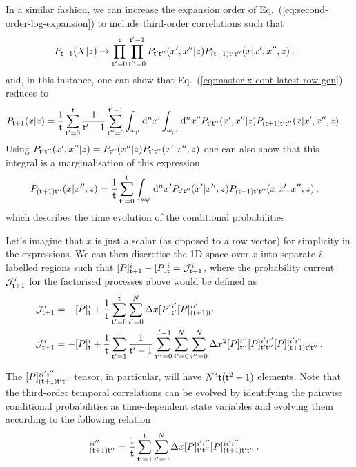 In a similar fashion, we can increase the expansion order of Eq.~(\ref{eq:second-order-log-expansion}) to include third-order correlations such that 
\begin{align}
P_{{\sf t}+1}(X\vert z) &\rightarrow \prod_{{\sf t}'=0}^{{\sf t}}\prod_{{\sf t}''=0}^{{\sf t}'-1} P_{{\sf t}'{\sf t}''}(x',x''\vert z)P_{({\sf t}+1){\sf t}'{\sf t}''}(x\vert x',x'',z) \,,
\end{align}
and, in this instance, one can show that Eq.~(\ref{eq:master-x-cont-latest-row-gen}) reduces to
\begin{align}
P_{{\sf t}+1}(x\vert z) &= \frac{1}{{\sf t}}\sum_{{\sf t}'=0}^{{\sf t}}\frac{1}{{\sf t}'-1}\sum_{{\sf t}''=0}^{{\sf t}'-1}\int_{\omega_{{\sf t}'}}{\rm d}^nx'\int_{\omega_{{\sf t}''}}{\rm d}^nx'' P_{{\sf t}'{\sf t}''}(x',x''\vert z)P_{({\sf t}+1){\sf t}'{\sf t}''}(x\vert x',x'',z) \label{eq:third-order-correl} \,.
\end{align}
Using $P_{{\sf t}'{\sf t}''}(x',x''\vert z) = P_{{\sf t}''}(x''\vert z) P_{{\sf t}'{\sf t}''}(x'\vert x'', z)$ one can also show that this integral is a marginalisation of this expression
\begin{align}
P_{({\sf t}+1){\sf t}''}(x\vert x'', z) &= \frac{1}{{\sf t}}\sum_{{\sf t}'=0}^{{\sf t}}\int_{\omega_{{\sf t}'}}{\rm d}^nx'P_{{\sf t}'{\sf t}''}(x'\vert x'',z)P_{({\sf t}+1){\sf t}'{\sf t}''}(x\vert x',x'',z) \,,
\end{align}
which describes the time evolution of the conditional probabilities.

Let's imagine that $x$ is just a scalar (as opposed to a row vector) for simplicity in the expressions. We can then discretise the 1D space over $x$ into separate $i$-labelled regions such that $[P]^i_{{\sf t}+1} - [P]^i_{{\sf t}} = {\cal J}^i_{{\sf t}+1}$, where the probability current ${\cal J}^i_{{\sf t}+1}$ for the factorised processes above would be defined as
\begin{align}
{\cal J}^i_{{\sf t}+1} &= - [P]^i_{{\sf t}} + \frac{1}{{\sf t}}\sum^{{\sf t}}_{{\sf t}'=0}\sum_{i'=0}^N\Delta x[P]^{i'}_{{\sf t}'}[P]^{ii'}_{({\sf t}+1){\sf t}'} \\
{\cal J}^i_{{\sf t}+1} &= - [P]^i_{{\sf t}} + \frac{1}{{\sf t}}\sum^{{\sf t}}_{{\sf t}'=1}\frac{1}{{\sf t}'-1}\sum^{{\sf t}'-1}_{{\sf t}''=0}\sum_{i'=0}^N\sum_{i''=0}^N\Delta x^2[P]^{i''}_{{\sf t}''}[P]^{i'i''}_{{\sf t}'{\sf t}''}[P]^{ii'i''}_{({\sf t}+1){\sf t}'{\sf t}''}\,.
\end{align}

The $[P]^{ii'i''}_{({\sf t}+1){\sf t}'{\sf t}''}$ tensor, in particular, will have $N^3{\sf t}({\sf t}^2-1)$ elements. Note that the third-order temporal correlations can be evolved by identifying the pairwise conditional probabilities as time-dependent state variables and evolving them according to the following relation
\begin{align}
[P]^{ii''}_{({\sf t}+1){\sf t}''} &= \frac{1}{{\sf t}}\sum^{{\sf t}}_{{\sf t}'=1}\sum_{i'=0}^N\Delta x[P]^{i'i''}_{{\sf t}'{\sf t}''}[P]^{ii'i''}_{({\sf t}+1){\sf t}'{\sf t}''}\,.
\end{align}

